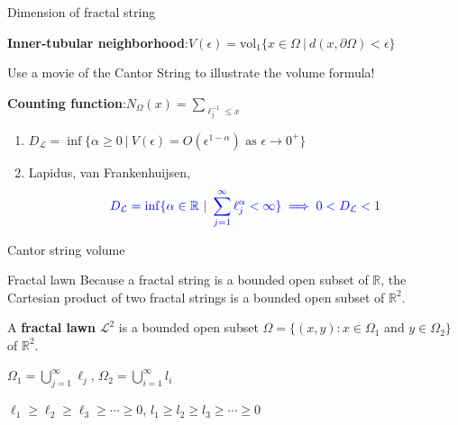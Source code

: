 \documentclass{if-beamer}
\newcommand{\R}{\mathbb{R}}
\begin{document}
\begin{frame}{Dimension of fractal string}

{\bf Inner-tubular neighborhood}:\quad $V(\epsilon) = \text{vol}_1\{x \in \Omega\ |\ d(x,\partial\Omega) < \epsilon\}$

\pause
\vspace{.2 in}

{\color{red} Use a movie of the Cantor String to illustrate the volume formula!}

\pause
\vspace{.2 in}

{\bf Counting function}:\quad $N_{\Omega}(x) = \sum_{\ell_j^{-1} \leq x}$





\begin{enumerate}
\item[] $D_{\mathcal{L}} = \inf\{\alpha \geq 0\ |\ V(\epsilon) = O(\epsilon^{1 - \alpha})\text{ as }\epsilon \to 0^+\}$ \\

\pause

\item[] Lapidus, van Frankenhuijsen, \cite{lapidus2000fractal, lapidus2003complex, lapidus2012fractal}
\[ {\color{blue} D_\mathcal{L} = \inf\{\alpha \in \mathbb{R}\ |\ \sum_{j = 1}^\infty \ell_j^{\alpha} < \infty\} \implies 0 < D_{\mathcal{L}} < 1} \]
\end{enumerate}


\end{frame}

\begin{frame}{Cantor string volume}
	\begin{center}
	\end{center}
\end{frame}

\begin{frame}{Fractal lawn}
Because a fractal string is a bounded open subset of $\R$, the Cartesian product of two fractal strings is a bounded open subset of $\R^2$.

\pause
\vspace{.2 in}

	\begin{definition}
	A {\bf fractal lawn} $\mathcal{L}^2$ is a bounded open subset $\Omega = \{(x,y): x \in \Omega_1$ and $y \in \Omega_2\}$ of $\R^2$.
	\end{definition}
	
\pause
\vspace{.2 in}

$\Omega_1 = \displaystyle\bigcup_{j = 1}^\infty\ell_j$, $\Omega_2 = \displaystyle\bigcup_{i = 1}^\infty l_i$

$\ell_1 \geq \ell_2 \geq \ell_3 \geq \cdots \geq 0$, $l_1 \geq l_2 \geq l_3 \geq \cdots \geq 0$
\end{frame}
\end{document}
